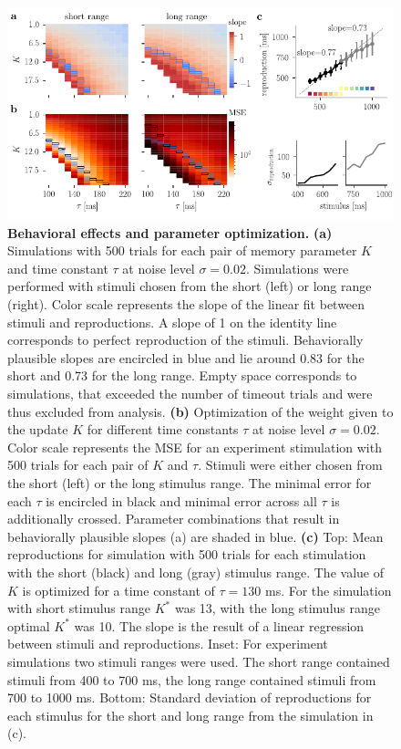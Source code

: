 \documentclass[10pt]{article}
\begin{document}
\begin{figure}[ht]
	\centering
	\includegraphics{figures/interIparams.pdf}
	\caption{\textbf{Behavioral effects and parameter optimization.} 
	\textbf{(a)} Simulations with 500 trials for each pair of memory parameter $K$ and time constant $\tau$ at noise level $\sigma = 0.02$. Simulations were performed with stimuli chosen from the short (left) or long range (right). Color scale represents the slope of the linear fit between stimuli and reproductions. A slope of 1 on the identity line corresponds to perfect reproduction of the stimuli. Behaviorally plausible slopes are encircled in blue and lie around 0.83 for the short and 0.73 for the long range. Empty space corresponds to simulations, that exceeded the number of timeout trials and were thus excluded from analysis.
	\textbf{(b)} Optimization of the weight given to the update $K$ for different time constants $\tau$ at noise level $\sigma = 0.02$. Color scale represents the MSE for an experiment stimulation with 500 trials for each pair of $K$ and $\tau$. Stimuli were either chosen from the short (left) or the long stimulus range. The minimal error for each $\tau$ is encircled in black and minimal error across all $\tau$ is additionally crossed. Parameter combinations that result in behaviorally plausible slopes (a) are shaded in blue.
	\textbf{(c)} Top: Mean reproductions for simulation with 500 trials for each stimulation with the short (black) and long (gray) stimulus range. The value of $K$ is optimized for a time constant of $\tau = 130$ ms. For the simulation with short stimulus range $K^*$ was 13, with the long stimulus range optimal $K^*$ was 10. 
		The slope is the result of a linear regression between stimuli and reproductions.
		Inset: For experiment simulations two stimuli ranges were used. The short range contained stimuli from 400 to 700 ms, the long range contained stimuli from 700 to 1000 ms.
		Bottom: Standard deviation of reproductions for each stimulus for the short and long range from the simulation in (c).
	}
\label{fig:parameter}
\end{figure}
\end{document}
